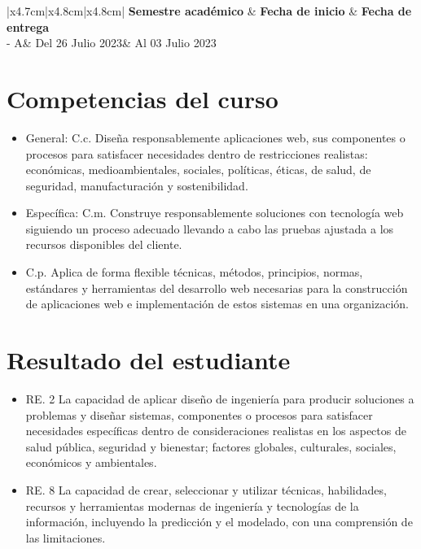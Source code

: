 \documentclass{article}
\newcommand{\itemAcademic}{2023 - A}
\newcommand{\itemInput}{Del 26 Julio 2023}
\newcommand{\itemOutput}{Al 03 Julio 2023}
\begin{document}
	\begin{table}[H]
		\begin{tabular}{|x{4.7cm}|x{4.8cm}|x{4.8cm}|}
			\hline 
			\color{white}\textbf{Semestre académico} & \color{white}\textbf{Fecha de inicio}  & \color{white}\textbf{Fecha de entrega}   \\
			\hline 
			\itemAcademic & \itemInput &  \itemOutput  \\
			\hline 
		\end{tabular}
	\end{table}
	
	\section{Competencias del curso}
	
	\begin{itemize}
		\item General: C.c. Diseña responsablemente aplicaciones web, sus componentes o procesos para satisfacer necesidades dentro de restricciones realistas: económicas, medioambientales, sociales, políticas, éticas, de salud, de seguridad, manufacturación y sostenibilidad.
		\item Específica: C.m. Construye responsablemente soluciones con tecnología web siguiendo un proceso adecuado llevando a cabo las pruebas ajustada a los recursos disponibles del cliente.
		\item C.p. Aplica de forma flexible técnicas, métodos, principios, normas, estándares y herramientas del desarrollo web necesarias para la construcción de aplicaciones web e implementación de estos sistemas en una organización.
	\end{itemize}
	
	\section{Resultado del estudiante}
	
	\begin{itemize}
		\item RE. 2 La capacidad de aplicar diseño de ingeniería para producir soluciones a problemas y diseñar sistemas, componentes o procesos para satisfacer necesidades específicas dentro de consideraciones realistas en los aspectos de salud pública, seguridad y bienestar; factores globales, culturales, sociales, económicos y ambientales.
		\item RE. 8 La capacidad de crear, seleccionar y utilizar técnicas, habilidades, recursos y herramientas modernas de ingeniería y tecnologías de la información, incluyendo la predicción y el modelado, con una comprensión de las limitaciones.
		
	\end{itemize}
	
\end{document}
